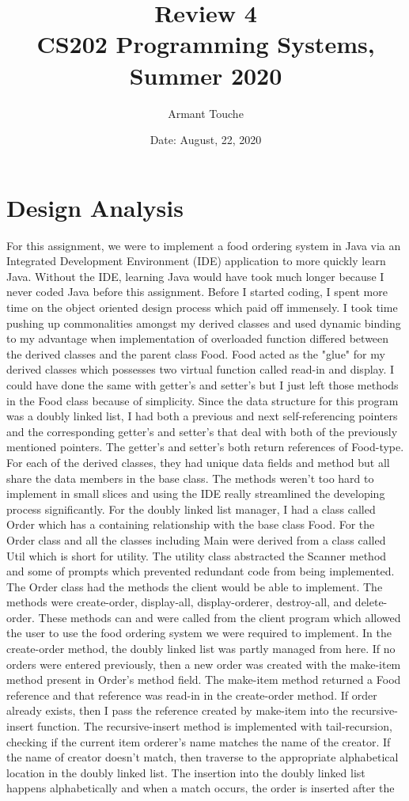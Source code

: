 \documentclass[11pt, a4paper]{article}
\title{\bf Review 4\\[1ex]
\rm\normalsize CS202 Programming Systems, Summer 2020 }
\date{\normalsize Date: August, 22, 2020}
\author{\normalsize Armant Touche}
\begin{document}
\vspace{0cm}\maketitle 

\section*{Design Analysis}
For this assignment, we were to implement a food ordering system in Java via an Integrated Development Environment (IDE) application to more quickly learn Java. Without the IDE, learning Java would have took much longer because I never coded Java before this assignment. Before I started coding, I spent more time on the object oriented design process which paid off immensely. I took time pushing up commonalities amongst my derived classes and used dynamic binding to my advantage when implementation of overloaded function differed between the derived classes and the parent class Food. Food acted as the "glue" for my derived classes which possesses two virtual function called read-in and display. I could have done the same with getter's and setter's but I just left those methods in the Food class because of simplicity. Since the data structure for this program was a doubly linked list, I had both a previous and next self-referencing pointers and the corresponding getter's and setter's that deal with both of the previously mentioned pointers. The getter's and setter's both return references of Food-type. For each of the derived classes, they had unique data fields and method but all share the data members in the base class. The methods weren't too hard to implement in small slices and using the IDE really streamlined the developing process significantly. For the doubly linked list manager, I had a class called Order which has a containing relationship with the base class Food. For the Order class and all the classes including Main were derived from a class called Util which is short for utility. The utility class abstracted the Scanner method and some of prompts which prevented redundant code from being implemented. The Order class had the methods the client would be able to implement. The methods were create-order, display-all, display-orderer, destroy-all, and delete-order. These methods can and were called from the client program which allowed the user to use the food ordering system we were required to implement. In the create-order method, the doubly linked list was partly managed from here. If no orders were entered previously, then a new order was created with the make-item method present in Order's method field. The make-item method returned a Food reference and that reference was read-in in the create-order method. If order already exists, then I pass the reference created by make-item into the recursive-insert function. The recursive-insert method is implemented with tail-recursion, checking if the current item orderer's name matches the name of the creator. If the name of creator doesn't match, then traverse to the appropriate alphabetical location in the doubly linked list. The insertion into the doubly linked list happens alphabetically and when a match occurs, the order is inserted after the 
\end{document}
